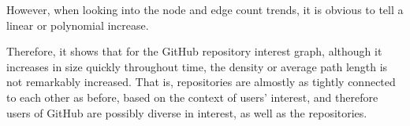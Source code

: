 \documentclass[11pt]{article}
\begin{document}
However, when looking into the node and edge count trends, it is obvious to tell a linear or polynomial increase.

Therefore, it shows that for the GitHub repository interest graph, although it increases in size quickly throughout time, the density or average path length is not remarkably increased. That is, repositories are almostly as tightly connected to each other as before, based on the context of users' interest, and therefore users of GitHub are possibly diverse in interest, as well as the repositories.

\begin{figure}[htp!]
  \centering
\end{figure}
\end{document}
